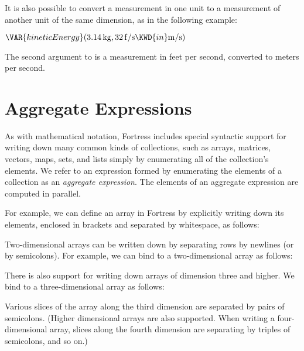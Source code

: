It is also possible to convert a measurement in one unit to
a measurement of another unit of the same dimension,
as in the following example:

\begin{Fortress}
\(\VAR{kineticEnergy}(3.14\,\mathrm{kg}, 32\,\mathrm{f}/\mathrm{s} \KWD{in} \mathrm{m}/\mathrm{s})\)
\end{Fortress}

The second argument to  is a measurement in
feet per second,
converted to meters per second.

\section{Aggregate Expressions}
As with mathematical notation, Fortress includes special syntactic support for
writing down many common kinds of collections, such as arrays, matrices, vectors, maps, sets, and lists
simply by enumerating all of the collection's elements.
We refer to an expression formed by enumerating the elements of a
collection as an \emph{aggregate expression}.
The elements of an aggregate expression are computed in parallel.

For example, we can define an array  in Fortress by explicitly writing down its elements, enclosed in brackets
and separated by whitespace, as follows:

\label{arrayAInf}


Two-dimensional arrays can be written down by separating rows by newlines (or by semicolons). For example, we can
bind  to a two-dimensional array as follows:

\label{arrayBInf}


There is also support for writing down arrays of dimension three and higher. We bind  to a three-dimensional
array as follows:

\label{arrayCInf}


Various slices of the array along the third dimension are separated by pairs of semicolons.
(Higher dimensional arrays
are also supported. When writing a four-dimensional
array, slices along the fourth dimension are separating by triples of semicolons, and so on.)

